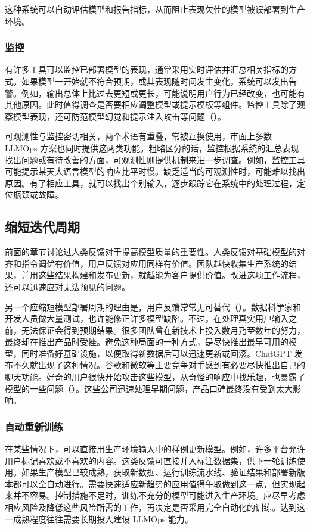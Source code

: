 这种系统可以自动评估模型和报告指标，从而阻止表现欠佳的模型被误部署到生产环境。

\subsubsection{监控}
有许多工具可以监控已部署模型的表现，通常采用实时评估并汇总相关指标的方式。如果模型一开始就不符合预期，或其表现随时间发生变化，系统可以发出告警。例如，输出总体上比过去更短或更长，可能说明用户行为已经改变，也可能有其他原因。此时值得调查是否要相应调整模型或提示模板等组件。监控工具除了观察模型表现，还可防范模型幻觉和提示注入攻击等问题（）。

可观测性与监控密切相关，两个术语有重叠，常被互换使用，市面上多数 LLMOps 方案也同时提供这两类功能。粗略区分的话，监控根据系统的汇总表现找出问题或有待改善的方面，可观测性则提供机制来进一步调查。例如，监控工具可能提示某天大语言模型的响应比平时慢。缺乏适当的可观测性时，可能难以找出原因。有了相应工具，就可以找出个别输入，逐步跟踪它在系统中的处理过程，定位瓶颈或故障。

\subsection{缩短迭代周期}
前面的章节讨论过人类反馈对于提高模型质量的重要性。人类反馈对基础模型的对齐和指令调优有价值，用户反馈对应用同样有价值。团队越快收集生产系统的结果，并用这些结果构建和发布更新，就越能为客户提供价值。改进这项工作流程，还可以迅速应对无法预见的问题。

另一个应缩短模型部署周期的理由是，用户反馈常常无可替代（）。数据科学家和开发人员做大量测试，也许能修正许多模型缺陷。不过，在处理真实用户输入之前，无法保证会得到预期结果。很多团队曾在新技术上投入数月乃至数年的努力，最终却在推出产品时受挫。避免这种局面的一种方式，是尽快推出最早可用的模型，同时准备好基础设施，以便取得新数据后可以迅速更新或回滚。ChatGPT 发布不久就出现了这种情况。谷歌和微软等主要竞争对手感到有必要尽快推出自己的聊天功能。好奇的用户很快开始攻击这些模型，从奇怪的响应中找乐趣，也暴露了模型的一些问题（）。这些公司迅速处理早期问题，产品口碑最终没有受到太大影响。

\subsubsection{自动重新训练}
在某些情况下，可以直接用生产环境输入中的样例更新模型。例如，许多平台允许用户标记喜欢或不喜欢的内容。这类反馈可直接并入标注数据集，供下一轮训练使用。如果生产模型已较成熟，获取新数据、运行训练流水线、验证结果和部署新版本都可以全自动进行。需要快速适应新趋势的应用值得争取做到这一点，但实现起来并不容易。控制措施不足时，训练不充分的模型可能进入生产环境。应尽早考虑相应风险及降低这些风险所需的工作，再决定是否采用完全自动化的训练。达到这一成熟程度往往需要长期投入建设 LLMOps 能力。

